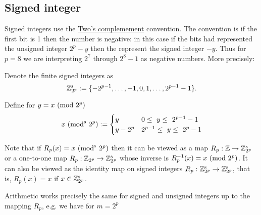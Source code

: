 \subsection{Signed integer}
Signed integers use the \href{https://epubs.siam.org/doi/abs/10.1137/1.9780898718072.ch3}{Two's complemement} convention. The convention is if the first bit is 1 then the number is negative: in this case if the bits had represented the unsigned integer $2^p - y$ then the represent the signed integer $-y$. Thus for $p = 8$ we are interpreting $2^7$ through $2^8-1$ as negative numbers. More precisely:

\begin{definition} Denote the finite signed integers as
\[
{\mathbb Z}_{2^p}^{\rm s} := \{-2^{p-1} ,\ldots, -1 ,0,1, \ldots, 2^{p-1}-1\}.
\]
\end{definition}

\begin{definition} Define for $y = x\ ({\rm mod}\ 2^p)$
\[
x\ ({\rm mod}^{\rm s}\ 2^p) := \begin{cases} y & 0 \ensuremath{\leq} y \ensuremath{\leq} 2^{p-1}-1 \\
                             y - 2^p & 2^{p-1} \ensuremath{\leq} y \ensuremath{\leq} 2^p - 1
                             \end{cases}
\]
\end{definition}

Note that if $R_p(x) = x\ ({\rm mod}^{\rm s}\ 2^p)$ then it can be viewed as a map $R_p : {\mathbb Z} \rightarrow {\mathbb Z}_{2^p}^{\rm s}$ or a one-to-one map $R_p : {\mathbb Z}_{2^p} \rightarrow {\mathbb Z}_{2^p}^{\rm s}$ whose inverse is $R_p^{-1}(x) = x\ ({\rm mod}\ 2^p)$. It can also be viewed as the identity map on signed integers $R_p : {\mathbb Z}_{2^p}^{\rm s} \rightarrow {\mathbb Z}_{2^p}^{\rm s}$, that is,  $R_p(x) = x$ if $x \in {\mathbb Z}_{2^p}^{\rm s}$.

Arithmetic works precisely the same for signed and unsigned integers up to the mapping $R_p$, e.g. we have for $m = 2^p$


